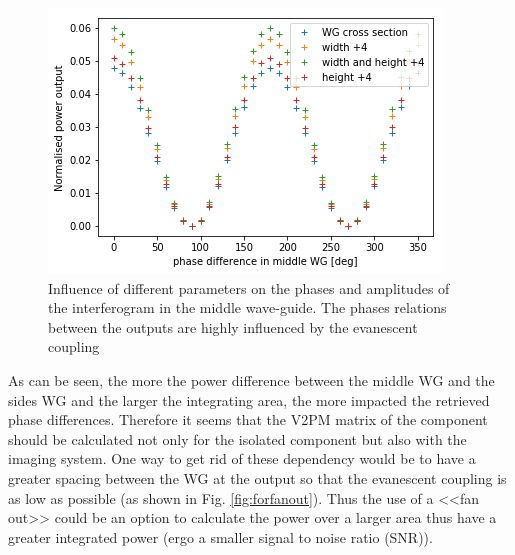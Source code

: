 \begin{figure}[htbp]
  \begin{minipage}[b]{.33\textwidth}
    \centering   \includegraphics[scale=.35]{picture/integrating_area/phase_python3.png}
  \end{minipage}
  \caption{Influence of different parameters on the phases and
    amplitudes of the interferogram in the middle wave-guide. The phases relations between the outputs are highly influenced by the evanescent coupling}
  \label{fig:phase_influence}
\end{figure}

As can be seen, the more the power difference between the middle WG
and the sides WG and the larger the integrating area, the more
impacted the retrieved phase differences. Therefore it seems that the V2PM matrix of the component should be calculated not only for the isolated component but also with the imaging system. One way to get rid of these dependency would be to have a greater spacing between the WG at the output so that the evanescent coupling is as low as possible (as shown in Fig. \ref{fig:forfanout}). Thus the use of a
<<fan out>> could be an option to calculate the power over a larger area thus have  a greater integrated power
(ergo a smaller signal to noise ratio (SNR)).
